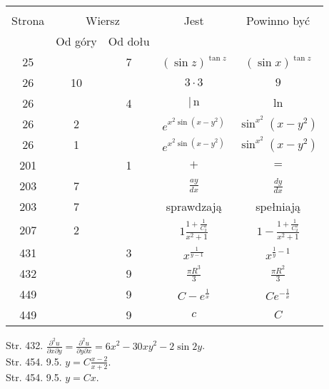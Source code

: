 \documentclass[a4paper,11pt]{article}
\begin{document}


\begin{center}

  \begin{tabular}{|c|c|c|c|c|}
    \hline
    & \multicolumn{2}{c|}{} & & \\
    Strona & \multicolumn{2}{c|}{Wiersz} & Jest
                              & Powinno być \\ \cline{2-3}
    & Od góry & Od dołu & & \\
    \hline
    25  & &  7 & $( \sin z )^{ \tan z }$ & $( \sin x )^{ \tan z }$ \\
    26  & 10 & & $3 \cdot 3$ & $9$ \\
    26  & &  4 & $|\, \mathrm{n}$ & $\ln$ \\
    26  &  2 & & $e^{ x^{ 2 } \sin( x - y^{ 2 } ) }$
           & $\sin^{ x^{ 2 } }( x - y^{ 2 } )$ \\
    26  &  1 & & $e^{ x^{ 2 } \sin( x - y^{ 2 } ) }$
           & $\sin^{ x^{ 2 } }( x - y^{ 2 } )$ \\
    201 & &  1 & $+$ & $=$ \\
    203 &  7 & & $\frac{ a y }{ d x }$ & $\frac{ dy }{ dx }$ \\
    203 &  7 & & sprawdzają & spełniają \\
    207 &  2 & & $1 \frac{ 1 +
                 \tfrac{ 1 }{ C_{ 2 }^{ 2 } } } { x^{ 2 } + 1 }$
           & $1 - \frac{ 1 +
             \frac{ 1 }{ C_{ 2 }^{ 2 } } }{ x^{ 2 } + 1 }$ \\
    431 & &  3 & $x^{ \frac{ 1 }{ y - 1 } }$ & $x^{ \frac{ 1 }{ y } - 1 }$ \\
    432 & &  9 & $\frac{ \pi R^{ 3 } }{ 3 }$ & $\frac{ \pi R^{ 2 } }{ 3 }$ \\
    449 & &  9 & $C - e^{ \frac{ 1 }{ x } }$ & $C e^{ -\frac{ 1 }{ x } }$ \\
    449 & &  9 & $c$ & $C$ \\
    \hline
  \end{tabular}

\end{center}

Str. 432.
$\frac{ \partial^{ 2 } u }{ \partial x \partial y }
= \frac{ \partial^{ 2 } u }{ \partial y \partial x }
= 6 x^{ 2 } - 30 x y^{ 2 } - 2 \sin 2y$. \\
Str. 454. 9.5. $y = C \frac{ x - 2 }{ x + 2 }$. \\
Str. 454. 9.5. $y = C x$.
\end{document}
